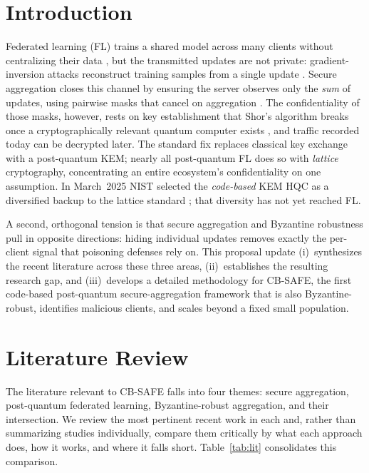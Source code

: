 \documentclass[conference]{IEEEtran}
\begin{document}
\section{Introduction}
Federated learning (FL) trains a shared model across many clients without
centralizing their data \cite{mcmahan2017}, but the transmitted updates are not
private: gradient-inversion attacks reconstruct training samples from a single
update \cite{zhu2019}. Secure aggregation closes this channel by ensuring the
server observes only the \emph{sum} of updates, using pairwise masks that cancel on
aggregation \cite{bonawitz2017}. The confidentiality of those masks, however, rests
on key establishment that Shor's algorithm breaks once a cryptographically relevant
quantum computer exists \cite{shor1997}, and traffic recorded today can be decrypted
later. The standard fix replaces classical key exchange with a post-quantum KEM;
nearly all post-quantum FL does so with \emph{lattice} cryptography, concentrating an
entire ecosystem's confidentiality on one assumption. In March~2025 NIST selected
the \emph{code-based} KEM HQC as a diversified backup to the lattice standard
\cite{nistir8545}; that diversity has not yet reached FL.

A second, orthogonal tension is that secure aggregation and Byzantine robustness
pull in opposite directions: hiding individual updates removes exactly the
per-client signal that poisoning defenses rely on. This proposal update
(i)~synthesizes the recent literature across these three areas, (ii)~establishes the
resulting research gap, and (iii)~develops a detailed methodology for CB-SAFE, the
first code-based post-quantum secure-aggregation framework that is also
Byzantine-robust, identifies malicious clients, and scales beyond a fixed small
population.

\section{Literature Review}
The literature relevant to CB-SAFE falls into four themes: secure aggregation,
post-quantum federated learning, Byzantine-robust aggregation, and their intersection.
We review the most pertinent recent work in each and, rather than summarizing studies
individually, compare them critically by what each approach does, how it works, and
where it falls short. Table~\ref{tab:lit} consolidates this comparison.
\end{document}
